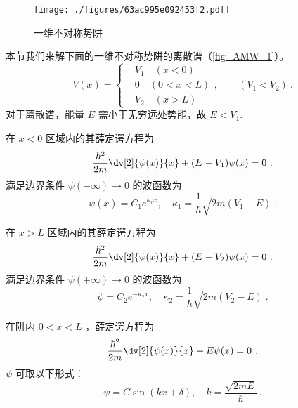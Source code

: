 
\begin{issues}
\issueTODO
{}
\end{issues}

\begin{figure}[ht]
\centering
\texttt{[image: ./figures/63ac995e092453f2.pdf]}
\caption{一维不对称势阱} \label{fig_AMW_1}
\end{figure}
本节我们来解下面的一维不对称势阱的离散谱（\autoref{fig_AMW_1}）。
\begin{equation}
V(x)=\left\{\begin{aligned}
&V_1\quad(x<0)\\
&0\quad (0<x<L)\\
&V_2\quad(x>L)
\end{aligned}\right.
,\qquad (V_1 < V_2)~.
\end{equation}
对于离散谱，能量 $E$ 需小于无穷远处势能，故 $E<V_1$. 

在 $x<0$ 区域内的其薛定谔方程为
\begin{equation}
\frac{\hbar^2}{2m}\dv[2]{\psi(x)}{x}+(E-V_1)\psi(x)=0~.
\end{equation}
满足边界条件 $\psi(-\infty)\to 0$ 的波函数为
\begin{equation}
\psi(x)=C_1 e^{\kappa_1 x},\quad \kappa_1=\frac{1}{\hbar}\sqrt{2m(V_1-E)}~.
\end{equation}


在 $x>L$ 区域内的其薛定谔方程为
\begin{equation}
\frac{\hbar^2}{2m}\dv[2]{\psi(x)}{x}+(E-V_2)\psi(x)=0~.
\end{equation}
满足边界条件 $\psi(+\infty)\to 0$ 的波函数为
\begin{equation}
\psi=C_2 e^{-\kappa_2 x},\quad \kappa_2=\frac{1}{\hbar}\sqrt{2m(V_2-E)}~.
\end{equation}


在阱内 $0 < x < L$ ，薛定谔方程为
\begin{equation}
\frac{\hbar^2}{2m}\dv[2]{\psi(x)}{x}+E\psi(x)=0~.
\end{equation}
$\psi$ 可取以下形式：
\begin{equation}
\psi=C\sin(kx+\delta),\quad k=\frac{\sqrt{2mE}}{\hbar}~.
\end{equation}

